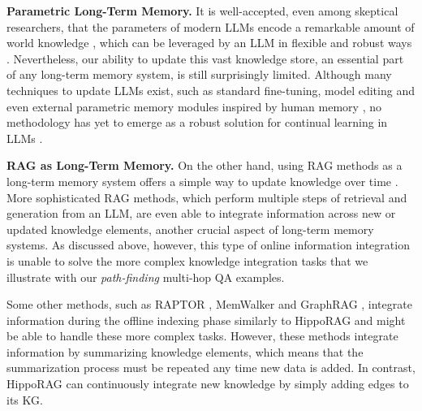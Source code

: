 \documentclass{article}
\begin{document}
\noindent \textbf{Parametric Long-Term Memory.} It is well-accepted, even among skeptical researchers, that the parameters of modern LLMs encode a remarkable amount of world knowledge \cite{AlKhamissi2022ARO,  Chen_Cao_Chen_Liu_Zhao_2024,  geva2023dissecting, gurnee2024language, he2024language, Kambhampati2024CanLL, petroni-etal-2019-language,wang2023survey}, which can be leveraged by an LLM in flexible and robust ways \cite{wang2023selfconsistency, wei2022chain, yu2023generate}.
Nevertheless, our ability to update this vast knowledge store, an essential part of any long-term memory system, is still surprisingly limited. Although many techniques to update LLMs exist, such as standard fine-tuning, model editing \cite{de-cao-etal-2021-editing, 8Meng2022LocatingAE, 10Mitchell2021FastME, 11Mitchell2022MemoryBasedME, nguyen2022survey, zhang2024comprehensive} and even external parametric memory modules inspired by human memory \cite{memoria, memoryllm, camelot}, no methodology has yet to emerge as a robust solution for continual learning in LLMs
\cite{gu2024model,li2024unveiling, 12Zhong2023MQuAKEAK}.

\noindent \textbf{RAG as Long-Term Memory.} 
On the other hand, using RAG methods as a long-term memory system offers a simple way to update knowledge over time \cite{15Izacard2022FewshotLW,14Lewis2020RetrievalAugmentedGF,13Ram2023InContextRL, Shi2023REPLUGRB}. 
More sophisticated RAG methods, which perform multiple steps of retrieval and generation from an LLM, are even able to integrate information across new or updated knowledge elements\cite{jiang-etal-2023-active, self-ask, shao-etal-2023-enhancing,ircot, xiong2021answering, yao2023react,yoran2023answering}, another crucial aspect of long-term memory systems. As discussed above, however, this type of online information integration is unable to solve the more complex knowledge integration tasks that we illustrate with our \textit{path-finding} multi-hop QA examples.

Some other methods, such as RAPTOR \cite{raptor}, MemWalker \cite{chen23walking} and GraphRAG \cite{graphrag}, integrate information during the offline indexing phase similarly to HippoRAG and might be able to handle these more complex tasks.
However, these methods integrate information by summarizing knowledge elements, which means that the summarization process must be repeated any time new data is added. In contrast, HippoRAG can continuously integrate new knowledge by simply adding edges to its KG.
\end{document}
